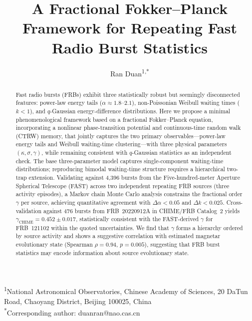 \documentclass[twocolumn]{article}
\begin{document}
\title{A Fractional Fokker--Planck Framework for Repeating Fast Radio Burst Statistics}

\author{Ran Duan\textsuperscript{1,*}}

\date{}


\onecolumn
\maketitle

\begin{center}
\textsuperscript{1}National Astronomical Observatories, Chinese Academy of Sciences, 20 DaTun Road, Chaoyang District, Beijing 100025, China\\[4pt]
\textsuperscript{*}Corresponding author: duanran@nao.cas.cn
\end{center}

\vspace{6pt}

\begin{abstract}
\noindent
Fast radio bursts (FRBs) exhibit three statistically robust but seemingly disconnected features: power-law energy tails ($\alpha \approx 1.8$--$2.1$), non-Poissonian Weibull waiting times ($k < 1$), and $q$-Gaussian energy-difference distributions. Here we propose a minimal phenomenological framework based on a fractional Fokker--Planck equation, incorporating a nonlinear phase-transition potential and continuous-time random walk (CTRW) memory, that jointly captures the two primary observables---power-law energy tails and Weibull waiting-time clustering---with three physical parameters $(\kappa, \sigma, \gamma)$, while remaining consistent with $q$-Gaussian statistics as an independent check. The base three-parameter model captures single-component waiting-time distributions; reproducing bimodal waiting-time structure requires a hierarchical two-trap extension. Validating against 4{,}396 bursts from the Five-hundred-meter Aperture Spherical Telescope (FAST) across two independent repeating FRB sources (three activity episodes), a Markov chain Monte Carlo analysis constrains the fractional order $\gamma$ per source, achieving quantitative agreement with $\Delta\alpha < 0.05$ and $\Delta k < 0.025$. Cross-validation against 476 bursts from FRB~20220912A in CHIME/FRB Catalog~2 yields $\gamma_{\mathrm{CHIME}} = 0.452 \pm 0.017$, statistically consistent with the FAST-derived $\gamma$ for FRB~121102 within the quoted uncertainties. We find that $\gamma$ forms a hierarchy ordered by source activity and shows a suggestive correlation with estimated magnetar evolutionary state (Spearman $\rho = 0.94$, $p = 0.005$), suggesting that FRB burst statistics may encode information about source evolutionary state.
\end{abstract}
\end{document}
